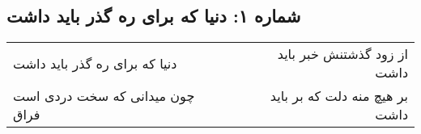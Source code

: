 \begin{center}
\section*{شماره ۱: دنیا که برای ره گذر باید داشت}
\label{sec:001}
\begin{longtable}{l p{0.5cm} r}
دنیا که برای ره گذر باید داشت
&&
از زود گذشتنش خبر باید داشت
\\
چون میدانی که سخت دردی است فراق
&&
بر هیچ منه دلت که بر باید داشت
\\
\end{longtable}
\end{center}
